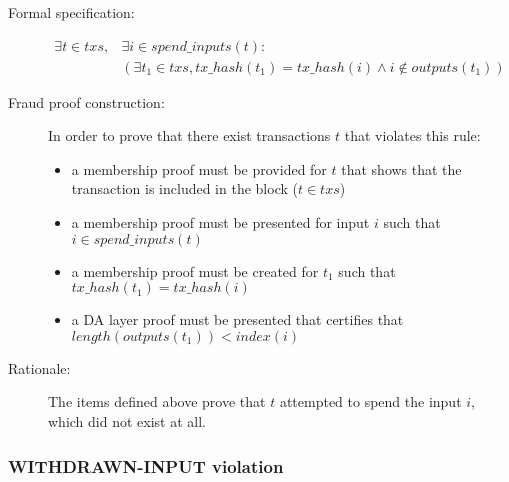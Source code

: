 \documentclass[../midgard.tex]{subfiles}
\begin{document}
\begin{description}

\item[Formal specification:]
\begin{equation*}
\begin{split}
    \exists t \in txs, &\exists i \in spend\_inputs(t): \\
    &( \exists t_1 \in txs, tx\_hash(t_1) = tx\_hash(i) \land i \notin outputs(t_1) )
\end{split}
\end{equation*}

\item[Fraud proof construction:] In order to prove that there exist transactions $t$ that violates this rule:
\begin{itemize}
    \item a membership proof must be provided for $t$ that shows that the transaction is included in the block ($t \in txs$)
    \item a membership proof must be presented for input $i$ such that $i \in spend\_inputs(t)$
    \item a membership proof must be created for $t_1$ such that $tx\_hash(t_1) = tx\_hash(i)$
    \item a DA layer proof must be presented that certifies that $length(outputs(t_1)) < index(i)$ \todo
\end{itemize}

\item[Rationale:] The items defined above prove that $t$ attempted to spend the input $i$, which did not exist at all.

\end{description}

\subsubsection{WITHDRAWN-INPUT violation}
\label{violation:WITHDRAWN-INPUT}
\end{document}

